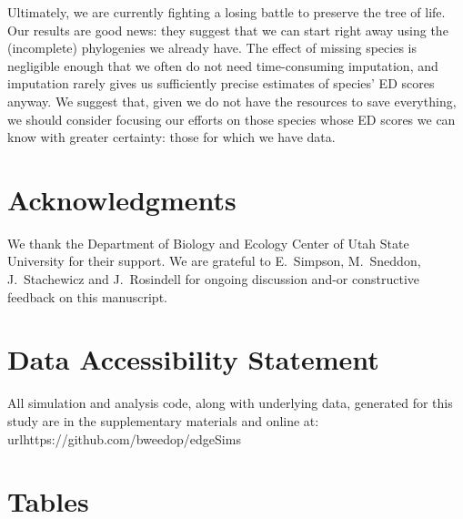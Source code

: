 \documentclass[10pt,english]{article}
\begin{document}
Ultimately, we are currently fighting a losing battle to preserve the tree of
life. Our results are good news: they suggest that we can start right away using
the (incomplete) phylogenies we already have. The effect of missing species is
negligible enough that we often do not need time-consuming imputation, and
imputation rarely gives us sufficiently precise estimates of species' ED scores
anyway. We suggest that, given we do not have the resources to save everything,
we should consider focusing our efforts on those species whose ED scores we can
know with greater certainty: those for which we have data.

\section*{Acknowledgments}
We thank the Department of Biology and Ecology Center of Utah State University
for their support. We are grateful to E.\ Simpson, M.\ Sneddon, J.\
Stachewicz and J.\ Rosindell for ongoing discussion and-or constructive feedback
on this manuscript.

\clearpage
\printbibliography

\section*{Data Accessibility Statement}
All simulation and analysis code, along with underlying data, generated for this
study are in the supplementary materials and online at:
url{https://github.com/bweedop/edgeSims}

\section*{Tables}
\end{document}
